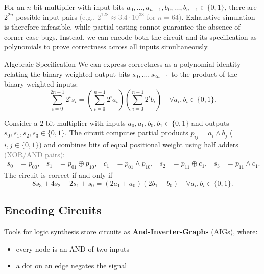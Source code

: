 \documentclass[a4paper, 11pt]{report}
\begin{document}
For an $n$-bit multiplier with input bits $a_0,\dots,a_{n-1}, b_0,\dots,b_{n-1} \in \{0,1\}$, there are $2^{2n}$ possible input pairs \textcolor{gray}{(e.g., $2^{128} \approx 3.4 \cdot 10^{38}$ for $n=64$)}. Exhaustive simulation is therefore infeasible, while partial testing cannot guarantee the absence of corner-case bugs. Instead, we can encode both the circuit and its specification as polynomials to prove correctness across all inputs simultaneously.

\begin{gframe}{Algebraic Specification}
We can express correctness as a polynomial identity relating the binary-weighted output bits $s_0,\dots,s_{2n-1}$ to the product of the binary-weighted inputs:
$$
    \sum_{i=0}^{2n-1} 2^i s_i = \left(\sum_{i=0}^{n-1} 2^i a_i\right)\left(\sum_{i=0}^{n-1} 2^i b_i\right) \quad \forall a_i, b_i \in \{0,1\}.
$$

Consider a $2$-bit multiplier with inputs $a_0, a_1, b_0, b_1 \in \{0,1\}$ and outputs $s_0, s_1, s_2, s_3 \in \{0,1\}$. The circuit computes partial products $p_{ij} = a_i \wedge b_j$ ($i,j \in \{0,1\}$) and combines bits of equal positional weight using half adders \textcolor{gray}{(XOR/AND pairs)}:
\begin{align*}
    s_0 &= p_{00}, &
    s_1 &= p_{01} \oplus p_{10}, &
    c_1 &= p_{01} \wedge p_{10}, &
    s_2 &= p_{11} \oplus c_1, &
    s_3 &= p_{11} \wedge c_1.
\end{align*}
The circuit is correct if and only if
$$
    8s_3 + 4s_2 + 2s_1 + s_0 = (2a_1 + a_0)(2b_1 + b_0) \quad \forall a_i, b_i \in \{0,1\}.
$$
\end{gframe}

\subsection{Encoding Circuits}
Tools for logic synthesis store circuits as \textbf{And-Inverter-Graphs} (AIGs), where:
\begin{itemize}
    \item every node is an AND of two inputs
    \item a dot on an edge negates the signal
\end{itemize}
\end{document}
